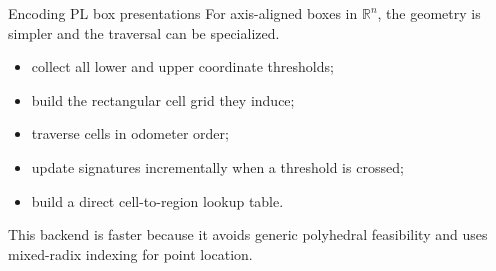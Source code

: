 \documentclass[aspectratio=169,11pt]{beamer}
\newcommand{\R}{\mathbb{R}}
\begin{document}
\begin{frame}{Encoding PL box presentations}
\small
For axis-aligned boxes in $\R^n$, the geometry is simpler and the traversal can be specialized.

\begin{itemize}
  \item collect all lower and upper coordinate thresholds;
  \item build the rectangular cell grid they induce;
  \item traverse cells in odometer order;
  \item update signatures incrementally when a threshold is crossed;
  \item build a direct cell-to-region lookup table.
\end{itemize}

\medskip
\raggedright
This backend is faster because it avoids generic polyhedral feasibility and uses mixed-radix indexing for point location.
\end{frame}
\end{document}
